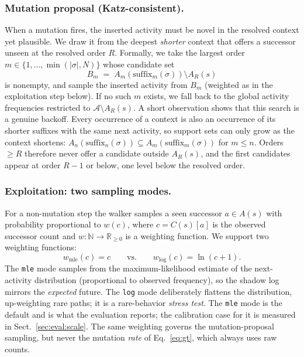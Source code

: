 \documentclass[runningheads]{llncs}
\begin{document}
\subsubsection{Mutation proposal (Katz-consistent).}
When a mutation fires, the inserted activity must be novel in the resolved context yet plausible. We draw it from the deepest \emph{shorter} context that offers a successor unseen at the resolved order $R$. Formally, we take the largest order $m\in\{1,\dots,\min(|\sigma|,N)\}$ whose candidate set
\begin{equation}
B_m \;=\; A_m(\mathrm{suffix}_m(\sigma))\setminus A_R(s)
\label{eq:proposal}
\end{equation}
is nonempty, and sample the inserted activity from $B_m$ (weighted as in the exploitation step below). If no such $m$ exists, we fall back to the global activity frequencies restricted to $\mathcal{A}\setminus A_R(s)$. A short observation shows that this search is a genuine backoff. Every occurrence of a context is also an occurrence of its shorter suffixes with the same next activity, so support sets can only grow as the context shortens: $A_n(\mathrm{suffix}_n(\sigma))\subseteq A_m(\mathrm{suffix}_m(\sigma))$ for $m\le n$. Orders $\ge R$ therefore never offer a candidate outside $A_R(s)$, and the first candidates appear at order $R{-}1$ or below, one level below the resolved order.

\subsubsection{Exploitation: two sampling modes.}
For a non-mutation step the walker samples a seen successor $a\in A(s)$ with probability proportional to $w(c)$, where $c=C(s)[a]$ is the observed successor count and $w:\mathbb{N}\to\mathbb{R}_{\ge0}$ is a weighting function. We support two weighting functions:
\begin{equation}
w_{\mathrm{mle}}(c)=c \qquad\text{vs.}\qquad w_{\mathrm{log}}(c)=\ln(c+1).
\end{equation}
The \texttt{mle} mode samples from the maximum-likelihood estimate of the next-activity distribution (proportional to observed frequency), so the shadow log mirrors the \emph{expected} future. The \texttt{log} mode deliberately flattens the distribution, up-weighting rare paths; it is a rare-behavior \emph{stress test}. The \texttt{mle} mode is the default and is what the evaluation reports; the calibration case for it is measured in Sect.~\ref{sec:eval:scale}. The same weighting governs the mutation-proposal sampling, but never the mutation \emph{rate} of Eq.~\eqref{eq:gt}, which always uses raw counts.
\end{document}
